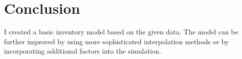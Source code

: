 \documentclass[11pt]{article}
\begin{document}
\section{Conclusion}
I created a basic inventory model based on the given data. The model can be further improved by using more sophisticated interpolation methods or by incorporating additional factors into the simulation.
\end{document}
